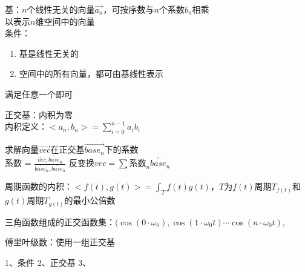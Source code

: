 \documentclass[UTF8]{ctexart}
\begin{document}
	\noindent 基：$n$个线性无关的向量$\overrightarrow{a_n}$，可按序数与$n$个系数$b_n$相乘 \\
	以表示$n$维空间中的向量 \\
	条件：\begin{enumerate}
		\item 基是线性无关的
		\item 空间中的所有向量，都可由基线性表示
	\end{enumerate}
	满足任意一个即可
	
	\hspace*{\fill}
	
	\noindent 正交基：内积为零 \\
	内积定义：$<a_n, b_n> = \sum_{i=0}^{n-1} a_i b_i$
	
	\hspace*{\fill}
	
	\noindent 求解向量$\overrightarrow{vec}$在正交基$\overrightarrow{base_n}$下的系数 \\
	系数 = $\frac {\overleftarrow{vec}, \overleftarrow{base_n}}{\overleftarrow{base_n}, \overleftarrow{base_n}}$ $反变换vec=\sum 系数_n\overleftarrow{base_n}$
	
	\hspace*{\fill}
	
	周期函数的内积：$<f(t), g(t)> = \displaystyle \int_T f(t)g(t)$，$T$为$f(t)$周期$T_{f(t)}$和$g(t)$周期$T_{g(t)}$的最小公倍数
	
	三角函数组成的正交函数集：$(\cos(0 \cdot \omega_0), \cos(1 \cdot \omega_0 t) \cdots \cos(n \cdot \omega_0 t),$
	
	傅里叶级数：使用一组正交基
	
	
	1、条件
	2、正交基
	3、
	
	
	
	
\end{document}
